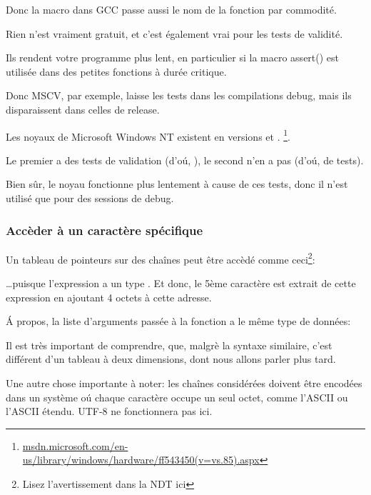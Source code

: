 

Donc la macro dans GCC passe aussi le nom de la fonction par commodité.

Rien n'est vraiment gratuit, et c'est également vrai pour les tests de validité.

Ils rendent votre programme plus lent, en particulier si la macro assert() est utilisée
dans des petites fonctions à durée critique.

Donc MSCV, par exemple, laisse les tests dans les compilations debug, mais ils disparaissent
dans celles de release.

Les noyaux de Microsoft \gls{Windows NT} existent en versions  et .
\footnote{\href{http://go.yurichev.com/17259}{msdn.microsoft.com/en-us/library/windows/hardware/ff543450(v=vs.85).aspx}}.

Le premier a des tests de validation (d'oú, ), le second n'en a pas (d'oú,  de tests).

Bien sûr, le noyau  fonctionne plus lentement à cause de ces tests, donc
il n'est utilisé que pour des sessions de debug.


\subsubsection{Accèder à un caractère spécifique}

Un tableau de pointeurs sur des chaînes peut être accèdé comme ceci\footnote{Lisez
l'avertissement dans la NDT ici }:



\dots puisque l'expression  a un type .
Et donc, le 5ème caractère est extrait de cette expression en ajoutant 4 octets à
cette adresse.

Á propos, la liste d'arguments passée à la fonction  a le même type de
données:



Il est très important de comprendre, que, malgrè la syntaxe similaire, c'est différent
d'un tableau à deux dimensions, dont nous allons parler plus tard.

Une autre chose importante à noter: les chaînes considérées doivent être encodées
dans un système oú chaque caractère occupe un seul octet, comme l'\ac{ASCII} ou l'\ac{ASCII}
étendu.
UTF-8 ne fonctionnera pas ici.

